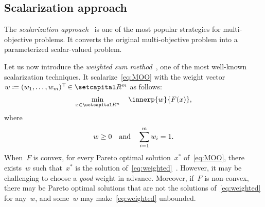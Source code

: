 \documentclass[../../main]{subfiles}
\begin{document}
\subsection{Scalarization approach}
The \emph{scalarization approach}~\cite{Gass1955,Geoffrion1968,Zadeh1963} is one of the most popular strategies for multi-objective problems.
It converts the original multi-objective problem into a parameterized scalar-valued problem.

Let us now introduce the \emph{weighted sum method}~\cite{Zadeh1963}, one of the most well-known scalarization techniques.
It scalarize~\cref{eq:MOO} with the weight vector~$w \coloneqq (w_1, \dots, w_m)^\T \in \setR^m$ as follows:
\[ \label{eq:weighted}
    \min_{x \in \setR^n} \quad \innerp{w}{F(x)}
,\] 
where
\[
    w \ge 0 \quad \text{and} \quad \sum_{i = 1}^{m} w_i = 1
.\] 
When~$F$ is convex, for every Pareto optimal solution~$x^\ast$ of~\cref{eq:MOO}, there exists~$w$ such that~$x^\ast$ is the solution of~\cref{eq:weighted}~\cite{Miettinen1998}.
However, it may be challenging to choose a \emph{good} weight in advance.
Moreover, if~$F$ is non-convex, there may be Pareto optimal solutions that are not the solutions of~\cref{eq:weighted} for any~$w$, and some~$w$ may make~\cref{eq:weighted} unbounded.
\end{document}
